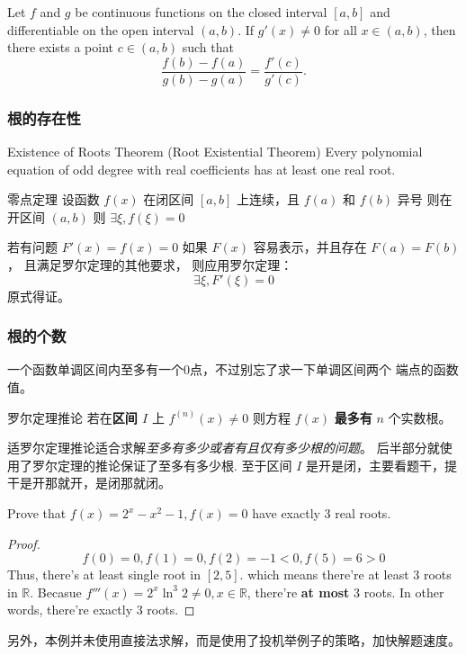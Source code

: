 \begin{theorem} \label{cauthy-mean-value}
    Let $f$ and $g$ be continuous functions on the closed interval $[a, b]$ and differentiable on the open interval $(a, b)$. If $g'(x) \neq 0$ for all $x \in (a, b)$, then there exists a point $c \in (a, b)$ such that
    \[
        \frac{f(b) - f(a)}{g(b) - g(a)} = \frac{f'(c)}{g'(c)}.
    \]
\end{theorem}

\subsubsection{根的存在性}

\begin{definition} {Existence of Roots Theorem (Root Existential Theorem)} 
    Every polynomial equation of odd degree with real coefficients has at least one real root.
\end{definition}
\begin{definition}{零点定理}
    设函数 $f(x)$ 在闭区间 $\left[a, b\right]$ 上连续，且 $f(a)$ 和 $f(b)$ 异号
    则在开区间 $\left(a, b\right)$ 则 $\exists \xi, f(\xi) = 0$
\end{definition}

若有问题 $F'(x) = f(x) = 0$ 如果 $F(x)$ 容易表示，并且存在 $F(a)=F(b)$，
且满足罗尔定理的其他要求，
则应用罗尔定理：
\[
    \exists \xi, F'(\xi) = 0
\]
原式得证。

\subsubsection{根的个数} \label{number-of-roots-question}

一个函数单调区间内至多有一个0点，不过别忘了求一下单调区间两个
端点的函数值。

\begin{lemma}{罗尔定理推论}
    若在\textbf{区间 $I$} 上 $f^{(n)}(x) \neq 0$ 
    则方程 $f(x)$ \textbf{最多有} $n$ 个实数根。
\end{lemma}
适罗尔定理推论适合求解\emph{至多有多少或者有且仅有多少根的问题}。
后半部分就使用了罗尔定理的推论保证了至多有多少根.
至于区间 $I$ 是开是闭，主要看题干，提干是开那就开，是闭那就闭。

\begin{example}{\cite[page 77, pdf 88，例4]{we}}
    \label{ex:special-val-substitution}
    Prove that $f(x) = 2^x - x^2 - 1, f(x) = 0$ have exactly 3 real roots.
    \begin{proof}
        \[
            f(0) = 0, f(1) = 0, f(2) = -1 < 0, f(5) = 6 > 0
        \]
        Thus, there's at least single root in $[2, 5]$. 
        which means there're at least 3 roots in $\mathbb{R}$.
        Becasue $f'''(x) = 2^x \ln ^3 2 \neq 0, x \in \mathbb{R}$, there're \textbf{at most}
        3 roots.
        In other words, there're exactly 3 roots.
    \end{proof}
    另外，本例并未使用直接法求解，而是使用了投机举例子的策略，加快解题速度。
\end{example}

